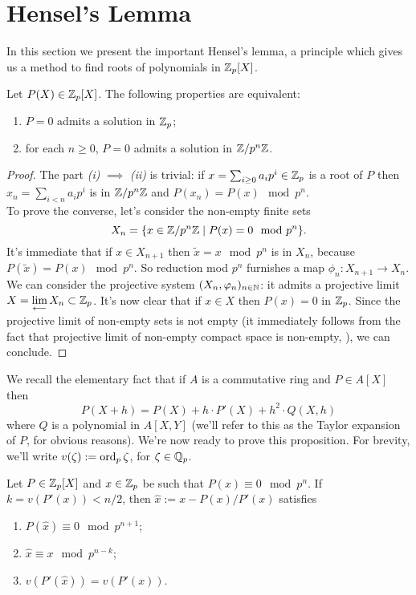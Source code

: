 	\section{Hensel's Lemma}
		In this section we present the important Hensel's lemma, a principle which gives us a method to find roots of polynomials in $\mathbb{Z}_p[X]$. 
		\begin{prop}
			Let $P(X) \in \mathbb{Z}_p[X]$. The following properties are equivalent:
			\begin{enumerate}[label=(\roman*)]
				\item $P=0$ admits a solution in $\mathbb{Z}_p$;
				\item for each $n \geq 0$, $P=0$ admits a solution in $\mathbb{Z}/p^n\mathbb{Z}$.
			\end{enumerate}
		\end{prop}
		\begin{proof}
			The part \textit{(i)} $\implies$ \textit{(ii)} is trivial: if $x = \sum_{i \geq 0} a_ip^i \in \mathbb{Z}_p$ is a root of $P$ then $x_n = \sum_{i < n}a_ip^i$ is in $\mathbb{Z}/p^n\mathbb{Z}$ and $P(x_n) = P(x) \mod p^n$.\\
			To prove the converse, let's consider the non-empty finite sets
			\[
				X_n = \{x \in \mathbb{Z}/p^n\mathbb{Z} \mid P(x) = 0 \mod p^n \}.
			\]
			It's immediate that if $x \in X_{n+1}$ then $\tilde{x} = x \mod p^n$ is in $X_n$, because $P(\tilde{x}) = P(x) \mod p^n$. So reduction mod $p^n$ furnishes a map $\phi_n\colon X_{n+1} \to X_n$. We can consider the projective system $(X_n, \varphi_n)_{n \in \mathbb{N}}$: it admits a projective limit $X = \lim\limits_{\longleftarrow} X_n \subset \mathbb{Z}_p$. It's now clear that if $x \in X$ then $P(x) = 0$ in $\mathbb{Z}_p$. Since the projective limit of non-empty sets is not empty (it immediately follows from the fact that projective limit of non-empty compact space is non-empty, \cite[30]{robert:padic-analysis}), we can conclude.
		\end{proof}
		We recall the elementary fact that if $A$ is a commutative ring and $P \in A[X]$ then
		\[
			P(X + h) = P(X) + h \cdot P'(X) + h^2 \cdot Q(X, h)
		\]
		where $Q$ is a polynomial in $A[X, Y]$ (we'll refer to this as the Taylor expansion of $P$, for obvious reasons). We're now ready to prove this proposition. For brevity, we'll write $v(\zeta) := \textrm{ord}_p\, \zeta$, for $\zeta \in \mathbb{Q}_p$.
		\begin{prop}
			\label{prop:newton-algorithm}
			Let $P \in \mathbb{Z}_p[X]$ and $x \in \mathbb{Z}_p$ be such that $P(x) \equiv 0 \mod p^n$. If $k = v(P'(x)) < n/2$, then $\widehat{x} := x - P(x)/P'(x)$ satisfies
			\begin{enumerate}[label=(\roman*)]
				\item $P(\widehat{x}) \equiv 0 \mod p^{n+1}$;
				\item $\widehat{x} \equiv x \mod p^{n-k}$;
				\item $v(P'(\widehat{x})) = v(P'(x))$.
			\end{enumerate}
		\end{prop}
